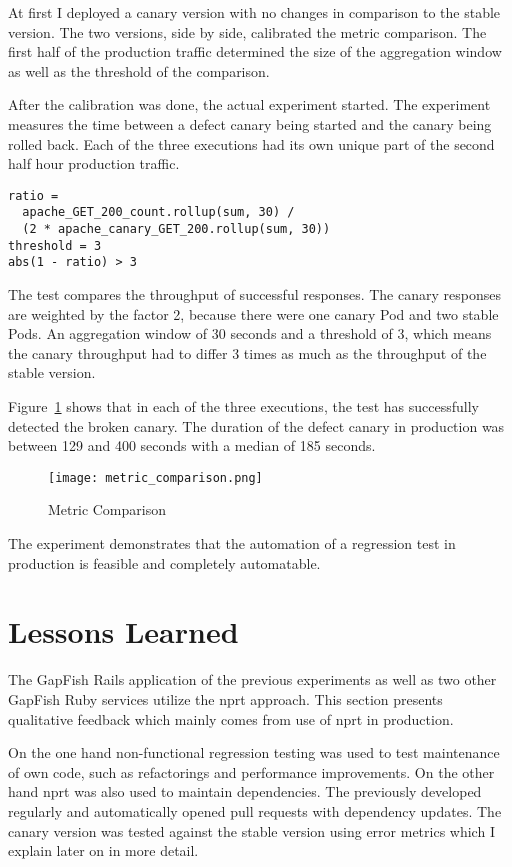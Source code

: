 At first I deployed a canary version with no changes in comparison to the stable version. The
two versions, side by side, calibrated the metric comparison. The first half of the
production traffic determined the size of the aggregation window as well as the threshold
of the comparison.

After the calibration was done, the actual experiment started. The experiment measures the
time between a defect canary being started and the canary being rolled back. Each
of the three executions had its own unique part of the second half hour production traffic.

\begin{verbatim}
ratio =
  apache_GET_200_count.rollup(sum, 30) /
  (2 * apache_canary_GET_200.rollup(sum, 30))
threshold = 3
abs(1 - ratio) > 3
\end{verbatim}

The test compares the throughput of successful responses. The canary responses are weighted by
the factor 2, because there were one canary Pod and two stable Pods. An aggregation window
of 30 seconds and a threshold of 3, which means the canary throughput had to differ 3 times
as much as the throughput of the stable version.

Figure~\ref{fig:metric_comparison} shows that in each of the three executions, the test
has successfully detected the broken canary. The duration of the defect canary in
production was between 129 and 400 seconds with a median of 185 seconds.

\begin{figure}[htbp]
  \centering
  \texttt{[image: metric\_comparison.png]}
  \caption{Metric Comparison}
  \label{fig:metric_comparison}
\end{figure}

The experiment demonstrates that the automation of a regression test in production is
feasible and completely automatable.

\section{Lessons Learned}

The GapFish Rails application of the previous experiments as well as two other
GapFish Ruby services utilize the \gls{nprt} approach. This section presents
qualitative feedback which mainly comes from use of \gls{nprt} in production.

On the one hand non-functional regression testing was used to test maintenance of own code,
such as refactorings and performance improvements. On the other hand \gls{nprt} was also
used to maintain dependencies. The previously developed \gemupdater regularly and
automatically opened pull requests with dependency updates. The canary version was tested against the stable version using
error metrics which I explain later on in more detail.


